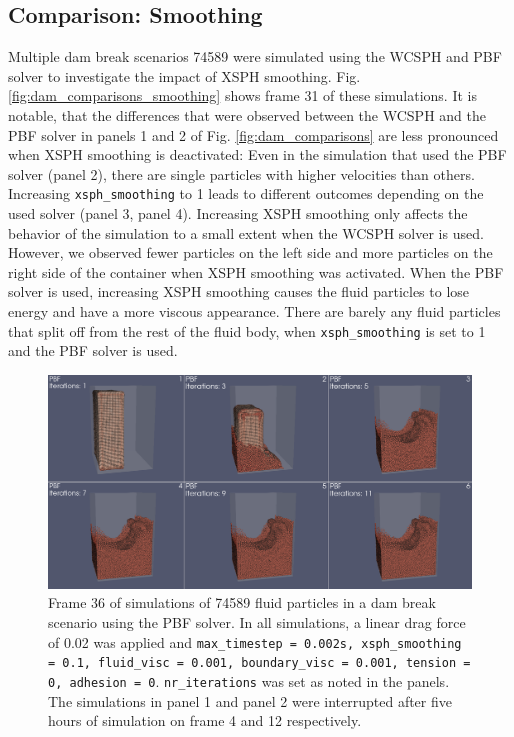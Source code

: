 \documentclass[11pt, letterpaper, twocolumn]{article}
\begin{document}
\subsection{Comparison: Smoothing}
\label{subsec:comparison_smoothing}
Multiple dam break scenarios 74589 were simulated using the WCSPH and PBF solver to investigate the impact of XSPH smoothing. Fig. \ref{fig:dam_comparisons_smoothing} shows frame 31 of these simulations. It is notable, that the differences that were observed between the WCSPH and the PBF solver in panels 1 and 2 of Fig. \ref{fig:dam_comparisons} are less pronounced when XSPH smoothing
is deactivated: Even in the simulation that used the PBF solver (panel 2), there are single particles with higher velocities than others. Increasing \texttt{xsph\_smoothing} to 1 leads to different outcomes depending on the used solver (panel 3, panel 4). Increasing XSPH smoothing only affects the behavior of the simulation to a small extent when the WCSPH solver is used. 
However, we observed fewer particles on the left side and more particles on the right side of the container when XSPH smoothing was activated. When the PBF solver is used, increasing XSPH smoothing causes the fluid particles to lose energy and have a more viscous appearance. There are barely any fluid particles that split off from the rest of the fluid body, when \texttt{xsph\_smoothing} is set to 1 and the PBF solver is used.   

\begin{figure}[!b]
  \centering
  \includegraphics[width=\textwidth]{images/iterations.0036.png}
  \caption{Frame 36 of simulations of 74589 fluid particles in a dam break scenario using the PBF solver. In all simulations, a linear drag force of 0.02 was applied and \texttt{max\_timestep = 0.002s, xsph\_smoothing = 0.1, fluid\_visc = 0.001, boundary\_visc = 0.001, tension = 0, adhesion = 0}. \texttt{nr\_iterations} was 
  set as noted in the panels. The simulations in panel 1 and panel 2 were interrupted after five hours of simulation on frame 4 and 12 respectively.}
  \label{fig:dam_comparisons_iterations}
\end{figure}
\end{document}
